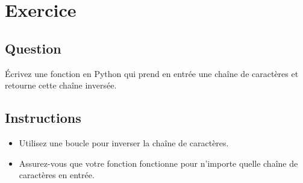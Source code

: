 \newcommand{\setMeta}[2]{}

\setMeta{title}{Manipulation de chaînes de caractères}
\setMeta{difficulty}{moyen}
\setMeta{solution}{0} 
\setMeta{bonus}{0}
\setMeta{author}{Moi}
\setMeta{language}{français}



\section{Exercice}

\subsection*{Question}
Écrivez une fonction en Python qui prend en entrée une chaîne de caractères et retourne cette chaîne inversée.

\subsection*{Instructions}
\begin{itemize}
    \item Utilisez une boucle pour inverser la chaîne de caractères.
    \item Assurez-vous que votre fonction fonctionne pour n'importe quelle chaîne de caractères en entrée.
\end{itemize}

